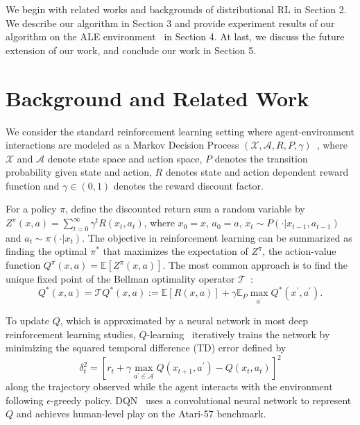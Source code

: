 \documentclass{article}
\begin{document}
We begin with related works and backgrounds of distributional RL in Section 2. We describe our algorithm in Section 3 and provide experiment results of our algorithm on the ALE environment~\citep{bellemare2013arcade} in Section 4. At last, we discuss the future extension of our work, and conclude our work in Section 5.


\section{Background and Related Work}
We consider the standard reinforcement learning setting where agent-environment interactions are modeled as a Markov Decision Process $(\mathcal{X}, \mathcal{A}, R, P, \gamma)$~\citep{Puterman:1994:MDP:528623}, where $\mathcal{X}$ and $\mathcal{A}$ denote state space and action space, $P$ denotes the transition probability given state and action, $R$ denotes state and action dependent reward function and $\gamma \in (0,1)$ denotes the reward discount factor.

For a policy $\pi$, define the discounted return sum a random variable by  $Z^\pi(x,a)=\sum_{t=0}^{\infty}\gamma^tR(x_t, a_t)$, where $x_0=x$, $a_0=a$, $x_{t} \sim P\left(\cdot | x_{t-1}, a_{t-1}\right)$ and $a_t \sim \pi(\cdot|x_t)$. The objective in reinforcement learning can be summarized as finding the optimal $\pi^*$ that maximizes the expectation of $Z^\pi$, the action-value function $Q^\pi(x, a)=\mathbb{E}[Z^\pi(x,a)]$. The most common approach is to find the unique fixed point of the Bellman optimality operator $\mathcal{T}$~\citep{Bellman:1957}: 
\begin{equation*}
    Q^*(x, a)=\mathcal{T} Q^*(x, a) :=\mathbb{E}[R(x, a)]+\gamma \mathbb{E}_{P} \max _{a^{\prime}} Q^*\left(x^{\prime}, a^{\prime}\right).
\end{equation*}

To update $Q$, which is approximated by a neural network in most deep reinforcement learning studies, $Q$-learning~\citep{watkins1989learning} iteratively trains the network by minimizing the squared temporal difference (TD) error defined by
\begin{equation*}
    \delta_{t}^{2}=\left[r_{t}+\gamma \max _{a^{\prime} \in \mathcal{A}} Q\left(x_{t+1}, a^{\prime}\right)-Q\left(x_{t}, a_{t}\right)\right]^{2}
\end{equation*}
along the trajectory observed while the agent interacts with the environment following $\epsilon$-greedy policy.
DQN~\citep{mnih2015humanlevel} uses a convolutional neural network to represent $Q$ and achieves human-level play on the Atari-57 benchmark.
\end{document}
